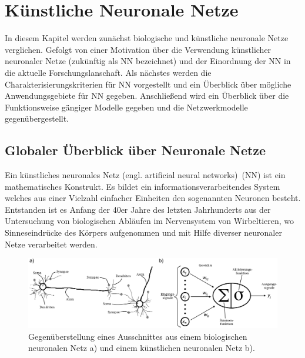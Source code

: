 

\section{Künstliche Neuronale Netze}

In diesem Kapitel werden zunächst biologische und künstliche neuronale Netze verglichen. Gefolgt von einer Motivation über die Verwendung künstlicher neuronaler Netze (zukünftig als NN bezeichnet) und der Einordnung der NN in die aktuelle Forschungslanschaft. Als nächstes werden die Charakterisierungskriterien für NN vorgestellt und ein Überblick über mögliche Anwendungsgebiete für NN gegeben. Anschließend wird ein Überblick über die Funktionsweise gängiger Modelle gegeben und die Netzwerkmodelle gegenübergestellt.

\subsection{Globaler Überblick über Neuronale Netze}\label{sec:einf_neuro}




Ein künstliches neuronales Netz (engl. artificial neural networks)~(NN) ist ein mathematisches Konstrukt. Es bildet ein informationsverarbeitendes System welches aus einer Vielzahl einfacher Einheiten den sogenannten Neuronen besteht. Entstanden ist es Anfang der 40er Jahre des letzten Jahrhunderts aus der Untersuchung von biologischen Abläufen im Nervensystem von Wirbeltieren, wo Sinneseindrücke des Körpers aufgenommen und mit Hilfe diverser neuronaler Netze verarbeitet werden.

\begin{figure}[!htb]
    \centering
        \includegraphics[width=1\textwidth]{Bilder/BNN_ANN.png}
    \caption{Gegenüberstellung eines Ausschnittes aus einem biologischen neuronalen Netz a)\protect\footnotemark{} und einem künstlichen neuronalen Netz b).}
    \label{fig:BNN_ANN}
\end{figure}

